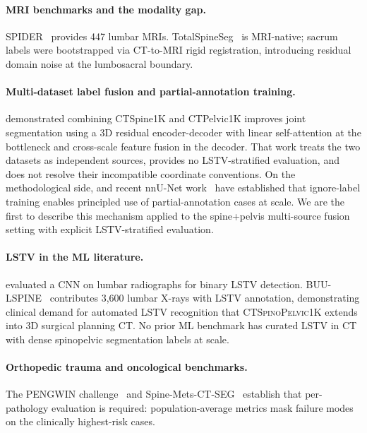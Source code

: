\documentclass[pmlr]{jmlr}
\newcommand{\dataset}{\textsc{CTSpinoPelvic1K}}
\begin{document}
\paragraph{MRI benchmarks and the modality gap.}
SPIDER~\citep{GraafSPIDERBenchmark} provides 447 lumbar MRIs.
TotalSpineSeg~\citep{Warszawer2025TotalSpineSeg:MRI} is MRI-native;
sacrum labels were bootstrapped via CT-to-MRI rigid registration,
introducing residual domain noise at the lumbosacral boundary.

\paragraph{Multi-dataset label fusion and partial-annotation
training.}
\citet{Li2025LumbarMechanism} demonstrated combining CTSpine1K and
CTPelvic1K improves joint segmentation using a 3D residual
encoder-decoder with linear self-attention at the bottleneck and
cross-scale feature fusion in the decoder.
That work treats the two datasets as independent sources, provides
no LSTV-stratified evaluation, and does not resolve their
incompatible coordinate conventions.
On the methodological side, \citet{Wasserthal2023TotalSegmentator:Images}
and recent nnU-Net work~\citep{Isensee2024Nnu-netSegmentation} have
established that ignore-label training enables principled use of
partial-annotation cases at scale.
We are the first to describe this mechanism applied to the
spine+pelvis multi-source fusion setting with explicit
LSTV-stratified evaluation.

\paragraph{LSTV in the ML literature.}
\citet{Kwak2025AutomatedModel} evaluated a CNN on lumbar radiographs for
binary LSTV detection.
BUU-LSPINE~\citep{Klinwichit2023BUU-LSPINE:Detection} contributes 3{,}600 lumbar X-rays with
LSTV annotation, demonstrating clinical demand for automated LSTV
recognition that \dataset{} extends into 3D surgical planning CT.
No prior ML benchmark has curated LSTV in CT with dense spinopelvic
segmentation labels at scale.

\paragraph{Orthopedic trauma and oncological benchmarks.}
The PENGWIN challenge~\citep{Sang2025BenchmarkChallenge} and
Spine-Mets-CT-SEG~\citep{Pieper2024Spine1} establish that per-pathology
evaluation is required: population-average metrics mask failure
modes on the clinically highest-risk cases.
\end{document}
